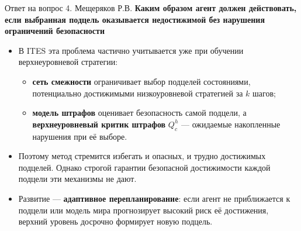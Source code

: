 
\begin{frame}[noframenumbering]{Ответ на вопрос 4. Мещеряков Р.В.}
    \small
    \textbf{Каким образом агент должен действовать, если выбранная подцель оказывается недостижимой без нарушения ограничений безопасности}

    \vspace{0.3em}
    \begin{itemize}
        \item В ITES эта проблема частично учитывается уже при обучении
              верхнеуровневой стратегии:
              \begin{itemize}
                  \item \textbf{сеть смежности} ограничивает выбор подцелей
                        состояниями, потенциально достижимыми низкоуровневой
                        стратегией за $k$ шагов;
                  \item \textbf{модель штрафов} оценивает безопасность самой
                        подцели, а \textbf{верхнеуровневый критик штрафов}
                        $Q^h_c$ --- ожидаемые накопленные нарушения при её
                        выборе.
              \end{itemize}
        \item Поэтому метод стремится избегать и опасных, и трудно достижимых
              подцелей. Однако строгой гарантии безопасной достижимости
              каждой подцели эти механизмы не дают.
        \item Развитие --- \textbf{адаптивное перепланирование}: если агент не
              приближается к подцели или модель мира прогнозирует высокий риск
              её достижения, верхний уровень досрочно формирует новую подцель.
    \end{itemize}
\end{frame}


